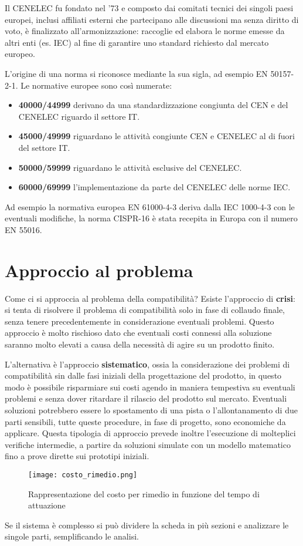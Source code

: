 Il CENELEC fu fondato nel '73 e composto dai comitati tecnici dei singoli paesi europei, inclusi affiliati
esterni che partecipano alle discussioni ma senza diritto di voto, è finalizzato all'armonizzazione: raccoglie 
ed elabora le norme emesse da altri enti (es. IEC) al fine di garantire uno standard richiesto dal mercato
europeo.

L'origine di una norma si riconosce mediante la sua sigla, ad esempio EN 50157-2-1.
\newpage
Le normative europee sono così numerate:
\begin{itemize}
 \item \textbf{40000/44999} derivano da una standardizzazione congiunta del CEN e del CENELEC riguardo
 il settore IT.
 \item \textbf{45000/49999} riguardano le attività congiunte CEN e CENELEC al di fuori del settore IT.
 \item \textbf{50000/59999} riguardano le attività esclusive del CENELEC.
 \item \textbf{60000/69999} l'implementazione da parte del CENELEC delle norme IEC.
\end{itemize}
Ad esempio la normativa europea EN 61000-4-3 deriva dalla IEC 1000-4-3 con le eventuali modifiche, la 
norma CISPR-16 è stata recepita in Europa con il numero EN 55016. 

\section{Approccio al problema}
Come ci si approccia al problema della compatibilità? Esiste l'approccio di \textbf{crisi}: si tenta di risolvere il
problema di compatibilità solo in fase di collaudo finale, senza tenere precedentemente in considerazione
eventuali problemi.
Questo approccio è molto rischioso dato che eventuali costi connessi alla soluzione saranno molto elevati
a causa della necessità di agire su un prodotto finito.

L'alternativa è l'approccio \textbf{sistematico}, ossia la considerazione dei problemi di compatibilità sin dalle fasi iniziali
della progettazione del prodotto, in questo modo è possibile risparmiare sui costi agendo in maniera tempestiva
su eventuali problemi e senza dover ritardare il rilascio del prodotto sul mercato.
Eventuali soluzioni potrebbero essere lo spostamento di una pista o l'allontanamento di due parti sensibili,
tutte queste procedure, in fase di progetto, sono economiche da applicare.
Questa tipologia di approccio prevede inoltre l'esecuzione di molteplici verifiche intermedie, a partire
da soluzioni simulate con un modello matematico fino a prove dirette sui prototipi iniziali.
\begin{figure}[h]
 \texttt{[image: costo\_rimedio.png]}
 \centering
 \caption{Rappresentazione del costo per rimedio in funzione del tempo di attuazione}
 \label{fig:costo_rimedio}
\end{figure}
Se il sistema è complesso si può dividere la scheda in più sezioni e analizzare le singole parti,
semplificando le analisi.



